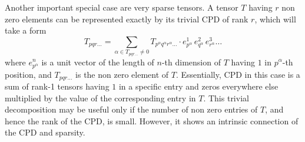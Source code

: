 Another important special case are very sparse tensors. A tensor $T$ having $r$
non zero elements can be represented exactly by its trivial CPD of rank $r$, 
which will take a form
\begin{equation}
T_{pqr\ldots} = \sum_{\alpha \in T_{pqr\ldots} \neq 0} T_{p^\alpha q^{\alpha} 
r^{\alpha}\ldots} \cdot e^{1}_{p^{\alpha}} \, e^{2}_{q^\alpha} \, 
e^{3}_{r^\alpha} \ldots
\label{eq:trivial_cpd_dec}
\end{equation}
where $e^{n}_{p^{\alpha}}$ is a unit vector of the length of $n$-th dimension 
of $T$ having $1$ in $p^{\alpha}$-th position, and $T_{pqr\ldots}$ is the non 
zero element of $T$. Essentially, CPD in this case is a sum of rank-1 tensors 
having $1$ in a specific entry and zeros everywhere else multiplied by the 
value of the corresponding entry in $T$. This trivial decomposition may be 
useful only if the number of non zero entries of $T$, and hence the rank of the 
CPD, is small. However, it shows an intrinsic connection of the CPD and 
sparsity.

